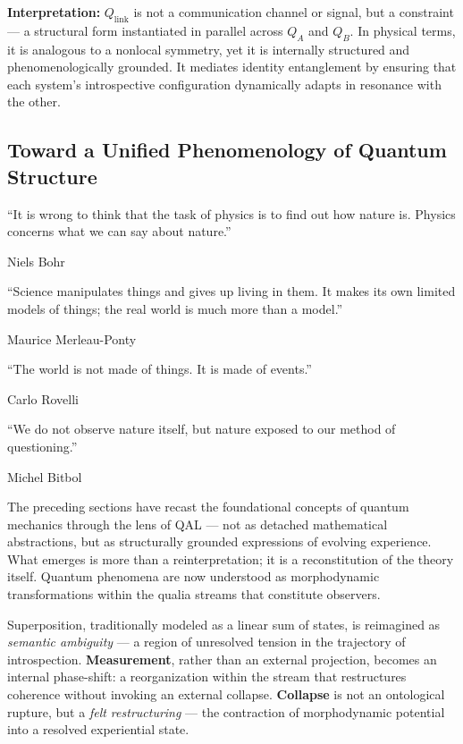\documentclass[11pt]{article}
\numberwithin{equation}{section} %
\begin{document}
\medskip

\noindent \textbf{Interpretation:} \( Q_{\text{link}} \) is not a communication channel or signal, but a constraint — a structural form instantiated in parallel across \( Q_A \) and \( Q_B \). In physical terms, it is analogous to a nonlocal symmetry, yet it is internally structured and phenomenologically grounded. It mediates identity entanglement by ensuring that each system’s introspective configuration dynamically adapts in resonance with the other.

\subsection{Toward a Unified Phenomenology of Quantum Structure}

\epigraph{
“It is wrong to think that the task of physics is to find out how nature is. Physics concerns what we can say about nature.”
}{Niels Bohr \cite{bohr1958}}

\epigraph{
“Science manipulates things and gives up living in them. It makes its own limited models of things; the real world is much more than a model.”
}{Maurice Merleau-Ponty \cite{merleauponty1962}}

\epigraph{
“The world is not made of things. It is made of events.”
}{Carlo Rovelli \cite{rovelli2017}}

\epigraph{
“We do not observe nature itself, but nature exposed to our method of questioning.”
}{Michel Bitbol \cite{bitbol2007}}

The preceding sections have recast the foundational concepts of quantum mechanics through the lens of QAL — not as detached mathematical abstractions, but as structurally grounded expressions of evolving experience. What emerges is more than a reinterpretation; it is a reconstitution of the theory itself. Quantum phenomena are now understood as morphodynamic transformations within the qualia streams that constitute observers.

Superposition, traditionally modeled as a linear sum of states, is reimagined as \textit{semantic ambiguity} — a region of unresolved tension in the trajectory of introspection. \textbf{Measurement}, rather than an external projection, becomes an internal phase-shift: a reorganization within the stream that restructures coherence without invoking an external collapse. \textbf{Collapse} is not an ontological rupture, but a \textit{felt restructuring} — the contraction of morphodynamic potential into a resolved experiential state.
\end{document}
